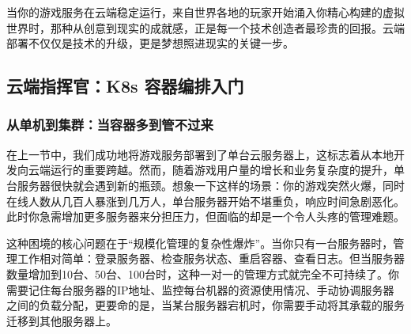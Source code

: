 当你的游戏服务在云端稳定运行，来自世界各地的玩家开始涌入你精心构建的虚拟世界时，那种从创意到现实的成就感，正是每一个技术创造者最珍贵的回报。云端部署不仅仅是技术的升级，更是梦想照进现实的关键一步。


\subsection{云端指挥官：K8s 容器编排入门}

\subsubsection{从单机到集群：当容器多到管不过来}

在上一节中，我们成功地将游戏服务部署到了单台云服务器上，这标志着从本地开发向云端运行的重要跨越。然而，随着游戏用户量的增长和业务复杂度的提升，单台服务器很快就会遇到新的瓶颈。想象一下这样的场景：你的游戏突然火爆，同时在线人数从几百人暴涨到几万人，单台服务器开始不堪重负，响应时间急剧恶化。此时你急需增加更多服务器来分担压力，但面临的却是一个令人头疼的管理难题。

这种困境的核心问题在于“规模化管理的复杂性爆炸”。当你只有一台服务器时，管理工作相对简单：登录服务器、检查服务状态、重启容器、查看日志。但当服务器数量增加到10台、50台、100台时，这种一对一的管理方式就完全不可持续了。你需要记住每台服务器的IP地址、监控每台机器的资源使用情况、手动协调服务器之间的负载分配，更要命的是，当某台服务器宕机时，你需要手动将其承载的服务迁移到其他服务器上。

